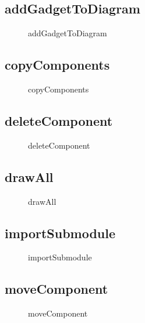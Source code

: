 \documentclass[12pt]{article}
\begin{document}
    \subsection{addGadgetToDiagram}
    \begin{figure}[H]
        \centering
        
        \caption{addGadgetToDiagram}
    \end{figure}

    \subsection{copyComponents}
    \begin{figure}[H]
        \centering
        
        \caption{copyComponents}
    \end{figure}

    \subsection{deleteComponent}
    \begin{figure}[H]
        \centering
        
        \caption{deleteComponent}
    \end{figure}

    \subsection{drawAll}
    \begin{figure}[H]
        \centering
        
        \caption{drawAll}
    \end{figure}


    \subsection{importSubmodule}
    \begin{figure}[H]
        \centering
        
        \caption{importSubmodule}
    \end{figure}


    \subsection{moveComponent}
    \begin{figure}[H]
        \centering
        
        \caption{moveComponent}
    \end{figure}
\end{document}

